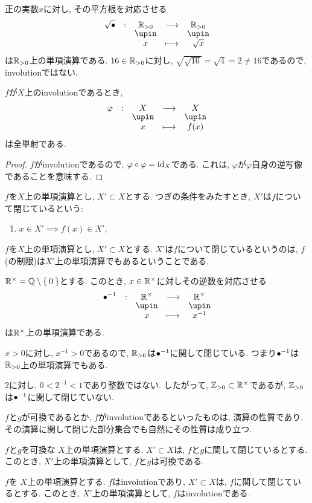 \begin{nonexample}
  正の実数$x$に対し, その平方根を対応させる
  \begin{align*}
    \shazo{\sqrt{\tofu}}
          {\RR_{>0}}{\RR_{>0}}
          {x}{\sqrt{x}}
  \end{align*}
  は$\mathbb{R}_{>0}$上の単項演算である.
  $16\in\mathbb{R}_{>0}$に対し,
  $\sqrt{\sqrt{16}}=\sqrt{4}=2\neq 16$であるので,
  involutionではない.
\end{nonexample}
\begin{prop}
  $f$が$X$上のinvolutionであるとき,
  \begin{align*}
    \shazo{\varphi}
          {X}{X}
          {x}{f(x)}
  \end{align*}
  は全単射である.
\end{prop}
\begin{proof}
  $f$がinvolutionであるので, $\varphi\circ\varphi=\operatorname{id}_X$である.
  これは, $\varphi$が$\varphi$自身の逆写像であることを意味する.
\end{proof}
\begin{definition}
  $f$を$X$上の単項演算とし,
  $X'\subset X$とする.
  つぎの条件をみたすとき,
  $X'$は$f$について閉じているという:
  \begin{enumerate}
  \item $x\in X'\implies f(x)\in X'$,
  \end{enumerate}
\end{definition}
\begin{remark}
  $f$を$X$上の単項演算とし,
  $X'\subset X$とする.
  $X'$は$f$について閉じているというのは,
  $f$(の制限)は$X'$上の単項演算でもあるということである,
\end{remark}
\begin{example}
  $\mathbb{R}^\times = \mathbb{Q}\setminus\Set{0}$とする.
  このとき,
  $x\in\mathbb{R}^\times$に対しその逆数を対応させる
  \begin{align*}
    \shazo{\tofu^{-1}}
          {\RR^{\times}}{\RR^{\times}}
          {x}{x^{-1}}
  \end{align*}
  は$\mathbb{R}^\times$上の単項演算である.

  $x>0$に対し, $x^{-1}>0$であるので,
  $\mathbb{R}_{>0}$は${\bullet}^{-1}$に関して閉じている.
  つまり${\bullet}^{-1}$は$\mathbb{R}_{>0}$上の単項演算でもある.

  $2$に対し, $0<2^{-1}<1$であり整数ではない.
  したがって, $\mathbb{Z}_{>0}\subset \mathbb{R}^{\times}$であるが,
  $\mathbb{Z}_{>0}$は${\bullet}^{-1}$に関して閉じていない.
\end{example}

$f$と$g$が可換であるとか,
$f$がinvolutionであるといったものは,
演算の性質であり,
その演算に関して閉じた部分集合でも自然にその性質は成り立つ.
\begin{prop}
  $f$と$g$を可換な
  $X$上の単項演算とする.
  $X'\subset X$は, $f$と$g$に関して閉じているとする.
  このとき,
  $X'$上の単項演算として, $f$と$g$は可換である.
\end{prop}
\begin{prop}
  $f$を
  $X$上の単項演算とする.
  $f$はinvolutionであり,
  $X'\subset X$は, $f$に関して閉じているとする.
  このとき,
  $X'$上の単項演算として,
  $f$はinvolutionである.
\end{prop}

